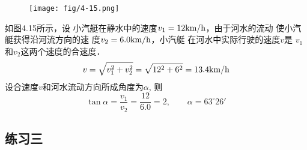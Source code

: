 \begin{enumerate}
\begin{figure}[htp]
    \centering
\texttt{[image: fig/4-15.png]}
    \caption{}
\end{figure}
\begin{solution}
    如图4.15所示，设
    小汽艇在静水中的速度$v_1=12\text{km}/\text{h}$，由于河水的流动
    使小汽艇获得沿河流方向的速
    度$v_2=6.0\text{km}/\text{h}$，小汽艇
    在河水中实际行驶的速度$v$是
    $v_1$和$v_2$这两个速度的合速度．
\[v=\sqrt{v_1^2+v_2^2}=\sqrt{12^2+6^2}=13.4\text{km}/\text{h}\]
设合速度$v$和河水流动方向所成角度为$\alpha$, 则
\[\tan\alpha=\frac{v_1}{v_2}=\frac{12}{6.0}=2,\qquad \alpha=63^{\circ}26'\]
\end{solution}
\end{enumerate}

\subsection{练习三}



